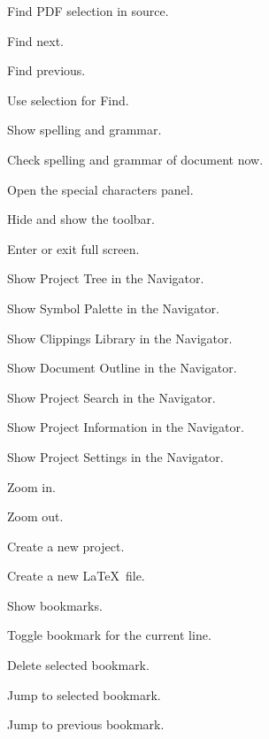 \begin{description}
	\item[] Find PDF selection in source.
	\item[] Find next.
	\item[] Find previous.
	\item[] Use selection for Find.
	\item[\keys{\cmdkey + {:}}] Show spelling and grammar.
	\item[\keys{\cmdkey + {;}}] Check spelling and grammar of document now.
	\item[] Open the special characters panel.
	\item[] Hide and show the toolbar.
	\item[] Enter or exit full screen.
	\item[] Show Project Tree in the Navigator.
	\item[] Show Symbol Palette in the Navigator.
	\item[] Show Clippings Library in the Navigator.
	\item[] Show Document Outline in the Navigator.
	\item[] Show Project Search in the Navigator.
	\item[] Show Project Information in the Navigator.
	\item[] Show Project Settings in the Navigator.
	\item[\keys{\cmdkey + \ensuremath{+}}] Zoom in.
	\item[\keys{\cmdkey + \ensuremath{-}}] Zoom out.
	\item[] Create a new project.
	\item[] Create a new \LaTeX\ file.
	\item[] Show bookmarks.
	\item[] Toggle bookmark for the current line.
	\item[\keys{\cmdkey + \delkey}] Delete selected bookmark.
	\item[] Jump to selected bookmark.
	\item[] Jump to previous bookmark.

\end{description}
